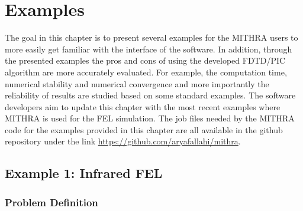 \chapter{Examples}
\label{chapter_examples}

The goal in this chapter is to present several examples for the MITHRA users to more easily get familiar with the interface of the software.
%
In addition, through the presented examples the pros and cons of using the developed FDTD/PIC algorithm are more accurately evaluated.
%
For example, the computation time, numerical stability and numerical convergence and more importantly the reliability of results are studied based on some standard examples.
%
The software developers aim to update this chapter with the most recent examples where MITHRA is used for the FEL simulation.
%
The job files needed by the MITHRA code for the examples provided in this chapter are all available in the github repository under the link \href{https://github.com/aryafallahi/mithra}{https://github.com/aryafallahi/mithra}.

\section{Example 1: Infrared FEL}

\subsection{Problem Definition}


